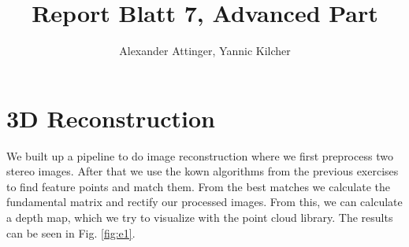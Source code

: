 \documentclass[11pt,a4paper]{article}
\author{Alexander Attinger, Yannic Kilcher}
\title{Report Blatt 7, Advanced Part}
\begin{document}
\maketitle

\section{3D Reconstruction}

We built up a pipeline to do image reconstruction where we first preprocess two stereo images. After that we use the kown algorithms from the previous exercises to find feature points and match them. From the best matches we calculate the fundamental matrix and rectify our processed images. From this, we can calculate a depth map, which we try to visualize with the point cloud library. The results can be seen in Fig. \ref{fig:e1}.
\end{document}

